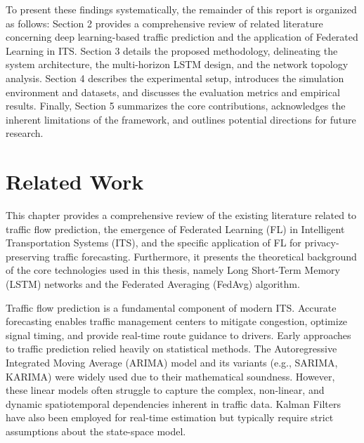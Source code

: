 \documentclass[pdflatex,sn-mathphys-num]{sn-jnl}
\theoremstyle{thmstyleone}
\theoremstyle{thmstyletwo}
\theoremstyle{thmstylethree}
\begin{document}
To present these findings systematically, the remainder of this report is organized as follows: Section 2 provides a comprehensive review of related literature concerning deep learning-based traffic prediction and the application of Federated Learning in ITS. Section 3 details the proposed methodology, delineating the system architecture, the multi-horizon LSTM design, and the network topology analysis. Section 4 describes the experimental setup, introduces the simulation environment and datasets, and discusses the evaluation metrics and empirical results. Finally, Section 5 summarizes the core contributions, acknowledges the inherent limitations of the framework, and outlines potential directions for future research.


\section{Related Work}

This chapter provides a comprehensive review of the existing literature related to traffic flow prediction, the emergence of Federated Learning (FL) in Intelligent Transportation Systems (ITS), and the specific application of FL for privacy-preserving traffic forecasting. Furthermore, it presents the theoretical background of the core technologies used in this thesis, namely Long Short-Term Memory (LSTM) networks and the Federated Averaging (FedAvg) algorithm.

Traffic flow prediction is a fundamental component of modern ITS. Accurate forecasting enables traffic management centers to mitigate congestion, optimize signal timing, and provide real-time route guidance to drivers. Early approaches to traffic prediction relied heavily on statistical methods. The Autoregressive Integrated Moving Average (ARIMA) model and its variants (e.g., SARIMA, KARIMA) were widely used due to their mathematical soundness. However, these linear models often struggle to capture the complex, non-linear, and dynamic spatiotemporal dependencies inherent in traffic data. Kalman Filters have also been employed for real-time estimation but typically require strict assumptions about the state-space model.
\end{document}
